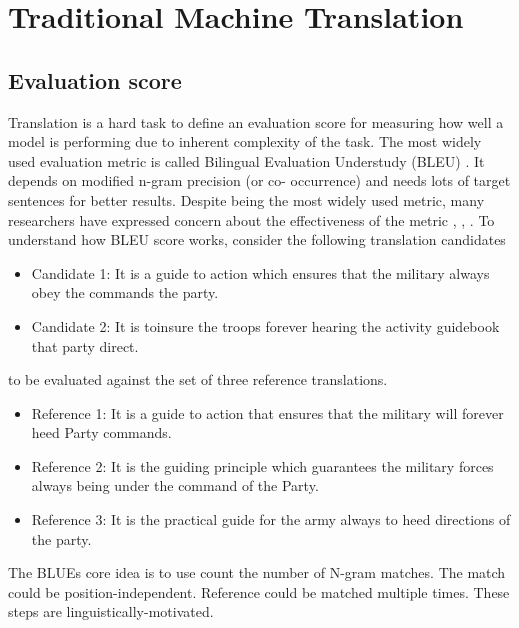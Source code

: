 \documentclass[a4paper]{article}
\begin{document}
\section{Traditional Machine Translation}

\subsection{Evaluation score}

Translation is a hard task to define an evaluation score for  measuring how well
a model is  performing  due to inherent complexity of the task. The most  widely
used  evaluation  metric  is  called  Bilingual   Evaluation  Understudy  (BLEU)
\cite{papineni2002bleu}.  It  depends  on  modified  n-gram  precision  (or  co-
occurrence) and needs lots of target sentences for better results. Despite being
the  most widely used metric, many researchers have expressed  concern about the
effectiveness of the metric \cite{zhang2004interpreting}, \cite{callison2006re},
\cite{ananthakrishnan2007some}. To understand how BLEU score works, consider the
following translation candidates


\begin{itemize}
  \item Candidate 1: It is  a  guide to action which ensures that  the  military
        always obey  the commands the  party.
  \item Candidate 2: It is  toinsure the troops  forever  hearing  the  activity
        guidebook that party  direct.
\end{itemize}


to be evaluated against the set of three reference translations.


\begin{itemize}
  \item Reference 1: It is a guide to action that ensures that the military will
        forever heed Party commands.
  \item Reference 2: It is the  guiding  principle which guarantees the military
        forces always being under the command of the Party.
  \item Reference 3: It  is  the  practical  guide  for  the army always to heed
        directions of the party.
\end{itemize}


The  BLUEs core idea is to use  count the  number  of N-gram  matches. The match
could  be position-independent. Reference could be matched multiple times. These
steps are linguistically-motivated.
\end{document}
